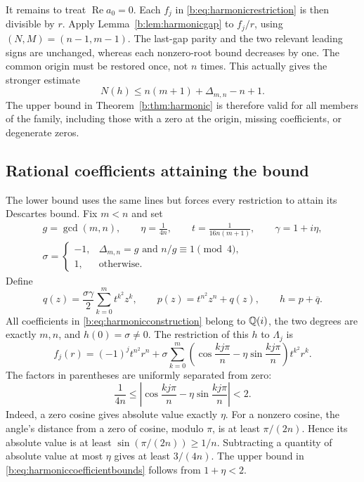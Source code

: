 \documentclass[UTF8,11pt]{ctexart}
\theoremstyle{definition}
\numberwithin{equation}{section}
\DeclareMathOperator{\Rea}{Re}\DeclareMathOperator{\Ima}{Im}
\begin{document}
It remains to treat $\Rea a_0=0$. Each $f_j$ in
\eqref{b:eq:harmonicrestriction} is then divisible by $r$.
Apply Lemma~\ref{b:lem:harmonicgap} to $f_j/r$, using
$(N,M)=(n-1,m-1)$. The last-gap parity and the two relevant leading
signs are unchanged, whereas each nonzero-root bound decreases by
one. The common origin must be restored once, not $n$ times. This
actually gives the stronger estimate
\[
 N(h)\le n(m+1)+\Delta_{m,n}-n+1.
\]
The upper bound in Theorem~\ref{b:thm:harmonic} is therefore valid for
all members of the family, including those with a zero at the
origin, missing coefficients, or degenerate zeros.

\subsection{Rational coefficients attaining the bound}
The lower bound uses the same lines but forces every restriction to
attain its Descartes bound. Fix $m<n$ and set
\begin{equation}\label{b:eq:harmonicparameters}
 \begin{gathered}
 g=\gcd(m,n),\qquad \eta=\frac1{4n},\qquad
 t=\frac1{16n(m+1)},\qquad \gamma=1+i\eta,\\
 \sigma=
 \begin{cases}
 -1,&\Delta_{m,n}=g\text{ and }n/g\equiv1\pmod4,\\
 1,&\text{otherwise}.
 \end{cases}
 \end{gathered}
\end{equation}
Define
\begin{equation}\label{b:eq:harmonicconstruction}
 q(z)=\frac{\sigma\gamma}{2}\sum_{k=0}^m t^{k^2}z^k,
 \qquad p(z)=t^{n^2}z^n+q(z),\qquad h=p+\overline q.
\end{equation}
All coefficients in \eqref{b:eq:harmonicconstruction} belong to
$\mathbb Q(i)$, the two degrees are exactly $m,n$, and $h(0)=\sigma\ne0$.
The restriction of this $h$ to $\Lambda_j$ is
\begin{equation}\label{b:eq:harmonicexplicitline}
 f_j(r)=(-1)^jt^{n^2}r^n+
 \sigma\sum_{k=0}^m
 \left(\cos\frac{kj\pi}{n}-\eta\sin\frac{kj\pi}{n}\right)
 t^{k^2}r^k.
\end{equation}
The factors in parentheses are uniformly separated from zero:
\begin{equation}\label{b:eq:harmoniccoefficientbounds}
 \frac1{4n}\le
 \left|\cos\frac{kj\pi}{n}-\eta\sin\frac{kj\pi}{n}\right|<2.
\end{equation}
Indeed, a zero cosine gives absolute value exactly $\eta$.
For a nonzero cosine, the angle's distance from a zero of cosine,
modulo $\pi$, is at least $\pi/(2n)$. Hence its absolute value is
at least $\sin(\pi/(2n))\ge1/n$. Subtracting a quantity of absolute
value at most $\eta$ gives at least $3/(4n)$. The upper bound in
\eqref{b:eq:harmoniccoefficientbounds} follows from $1+\eta<2$.
\end{document}
